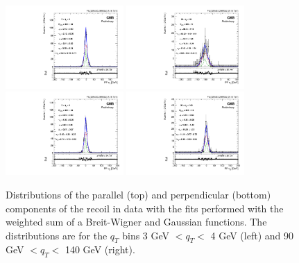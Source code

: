 \begin{figure} [!htbp]
\begin{center}
\includegraphics[width=0.4\textwidth]{Figures/WBoson/Analysis/Correction/Recoil/Syst/SystBWGauss/Data/pfu1fit_2.pdf}
\includegraphics[width=0.4\textwidth]{Figures/WBoson/Analysis/Correction/Recoil/Syst/SystBWGauss/Data/pfu1fit_29.pdf} \\
\includegraphics[width=0.4\textwidth]{Figures/WBoson/Analysis/Correction/Recoil/Syst/SystBWGauss/Data/pfu2fit_2.pdf}
\includegraphics[width=0.4\textwidth]{Figures/WBoson/Analysis/Correction/Recoil/Syst/SystBWGauss/Data/pfu2fit_29.pdf}
\caption{Distributions of the parallel (top) and perpendicular (bottom) components of the recoil in data with the fits performed with the weighted sum of a Breit-Wigner and Gaussian functions. The distributions are for the $q_{T}$ bins 3 GeV $< q_{T} <$ 4 GeV (left) and 90 GeV $< q_{T} <$ 140 GeV (right).}
\label{fig:figU12RecoilFitData_BWGauss}
\end{center}
\end{figure}

